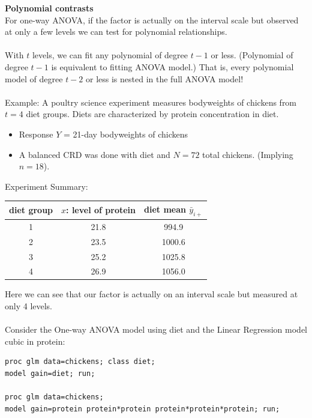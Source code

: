 \newpage

\textbf{Polynomial contrasts} \\
For one-way ANOVA, if the factor is actually on the interval scale but observed at only a few levels we can test for polynomial relationships.\\~\\
With $t$ levels, we can fit any polynomial of degree $t-1$ or less.  (Polynomial of degree $t-1$ is equivalent to fitting ANOVA model.)  That is, every polynomial model of degree $t-2$ or less is nested in the full ANOVA model!\\~\\
Example: A poultry science experiment measures bodyweights of chickens from $t=4$ diet groups.  Diets are characterized by protein concentration in diet.
\begin{itemize}
\item Response $Y$ = 21-day bodyweights of chickens 
\item A balanced CRD was done with diet and $N=72$ total chickens.  (Implying $n=18$).
\end{itemize}
Experiment Summary:
\begin{center}
\begin{tabular}{ccc}
diet group & $x$: level of protein & diet mean $\bar{y}_{i+} $\\\hline                                                                                
1 &              21.8         & 994.9       \\
2 &              23.5         & 1000.6 \\
3 &              25.2         & 1025.8 \\
4 &              26.9         & 1056.0\\ 
\hline
\end{tabular}
\end{center}
Here we can see that our factor is actually on an interval scale but measured at only 4 levels.  \\~\\
Consider the One-way ANOVA model using diet and the Linear Regression model cubic in protein:
\begin{small}
\begin{verbatim}
proc glm data=chickens; class diet;
model gain=diet; run;

proc glm data=chickens;
model gain=protein protein*protein protein*protein*protein; run;
\end{verbatim}
\end{small}

